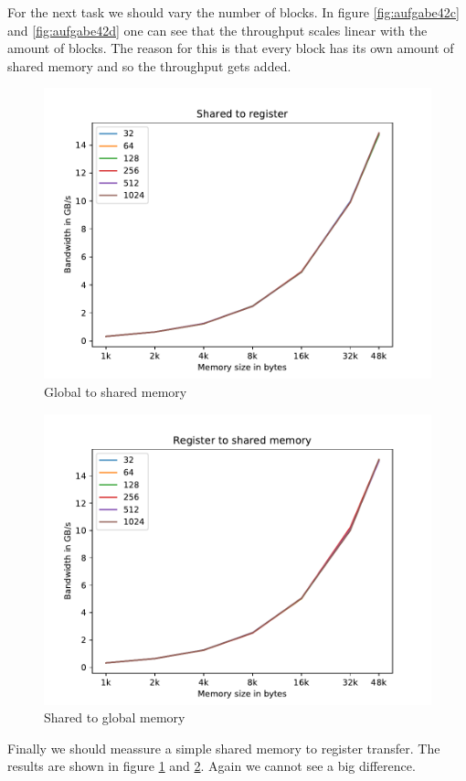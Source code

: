 \documentclass[12pt]{article}
\begin{document}
For the next task we should vary the number of blocks. In figure \ref{fig:aufgabe42c} and \ref{fig:aufgabe42d} one can see that the throughput scales linear with the amount of blocks. The reason for this is that every block has its own amount of shared memory and so the throughput gets added.

\begin{figure}
	\centering
	\includegraphics[width=0.7\linewidth]{../../template/plots/aufgabe4_2e}
	\caption{Global to shared memory}
	\label{fig:aufgabe42e}
\end{figure}

\begin{figure}
	\centering
	\includegraphics[width=0.7\linewidth]{../../template/plots/aufgabe4_2f}
	\caption{Shared to global memory}
	\label{fig:aufgabe42f}
\end{figure}

Finally we should meassure a simple shared memory to register transfer. The results are shown in figure \ref{fig:aufgabe42e} and \ref{fig:aufgabe42f}. Again we cannot see a big difference. \\
\end{document}
